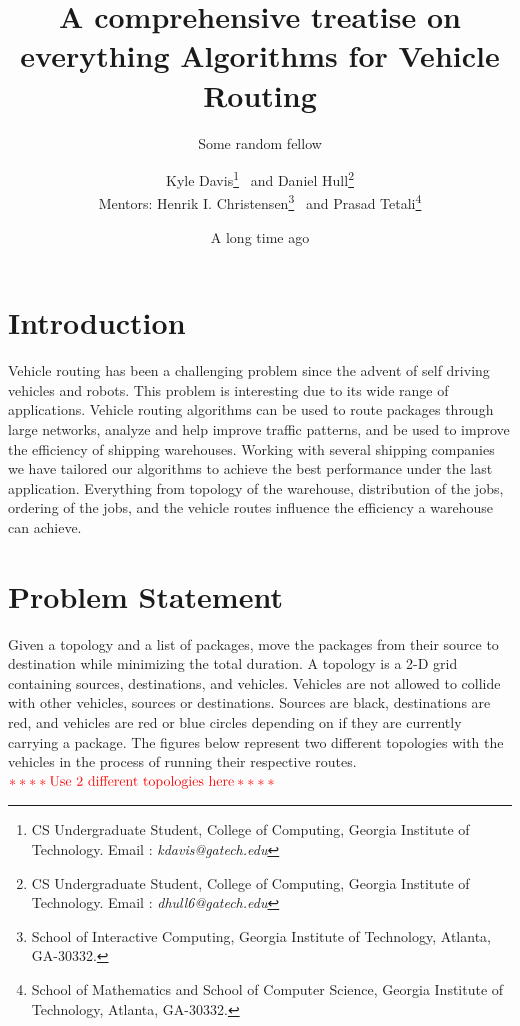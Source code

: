 \documentclass[11pt]{article}
\author{Some random fellow\vspace{-2ex}%
  }
\date{A long time ago}
\title{A comprehensive treatise on everything\vspace{-2ex}%
  }
\title{{\bf{\vspace{-8ex}Algorithms for Vehicle Routing}}
}
\author{
Kyle Davis\footnote{CS Undergraduate Student, College of Computing, Georgia Institute of Technology. Email : {\em{kdavis@gatech.edu}}} \ and Daniel Hull\footnote{CS Undergraduate Student, College of Computing, Georgia Institute of Technology. Email : {\em{dhull6@gatech.edu}}} \\
  Mentors: Henrik I. Christensen\footnote{School of Interactive Computing, Georgia Institute of Technology, Atlanta, GA-30332.} \ and Prasad Tetali\footnote{School of Mathematics and School of Computer Science, Georgia Institute of Technology, Atlanta, GA-30332.}
}
\date{}
\newcommand{\TODO}[1]{${\bf{\textcolor{red}{**** \text{#1} ****}}}$}
\begin{document}
\pagestyle{empty}
\maketitle
\thispagestyle{empty}
\vspace*{-1cm}


\section{Introduction}

Vehicle routing has been a challenging problem since the advent of self driving vehicles and robots. This problem is interesting due to its wide range of applications. Vehicle routing algorithms can be used to route packages through large networks, analyze and help improve traffic patterns, and be used to improve the efficiency of shipping warehouses. Working with several shipping companies we have tailored our algorithms to achieve the best performance under the last application. Everything from topology of the warehouse, distribution of the jobs, ordering of the jobs, and the vehicle routes influence the efficiency a warehouse can achieve.

\section{Problem Statement}

Given a topology and a list of packages, move the packages from their source to destination while minimizing the total duration. A topology is a 2-D grid containing sources, destinations, and vehicles. Vehicles are not allowed to collide with other vehicles, sources or destinations. Sources are black, destinations are red, and vehicles are red or blue circles depending on if they are currently carrying a package. The figures below represent two different topologies with the vehicles in the process of running their respective routes. \\

\TODO{Use 2 different topologies here}
\end{document}
